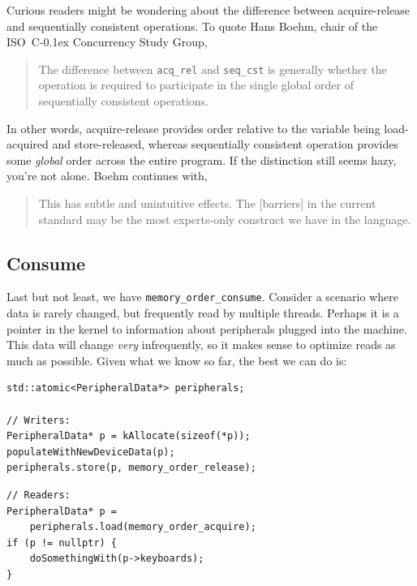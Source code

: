 \documentclass[fontsize=10pt, numbers=endperiod]{scrartcl}
\newcommand{\codesize}{\fontsize{10pt}{12pt}}
\newcommand{\cpp}[1]{C\kern-0.1ex\raisebox{0.15ex}{\texttt{++}}{\addfontfeature{Numbers=LowercaseOff}#1}}
\newenvironment{colfigure}
  {\par\vspace{1\baselineskip minus 0.5\baselineskip}\noindent\minipage{\linewidth}}
  {\endminipage\vspace*{1\baselineskip minus 0.7\baselineskip}}
\begin{document}
\begin{multicols*}{2}
Curious readers might be wondering about the difference between
acquire-release and sequentially consistent operations.
To quote Hans Boehm, chair of the ISO~\cpp{} Concurrency Study Group,
\begin{quote}
\small
The difference between \texttt{acq\_rel} and \texttt{seq\_cst} is generally
whether the operation is required to participate in the
single global order of sequentially consistent operations.
\end{quote}
In other words, acquire-release provides order relative to the variable
being load-acquired and store-released, whereas sequentially consistent
operation provides some \emph{global} order across the entire program.
If the distinction still seems hazy, you're not alone.
Boehm continues with,
\begin{quote}
\small
This has subtle and unintuitive effects.
The [barriers] in the current standard may be the most
experts-only construct we have in the language.
\end{quote}

\subsection{Consume}

Last but not least, we have \texttt{memory\_order\_consume}.
Consider a scenario where data is rarely changed,
but frequently read by multiple threads.
Perhaps it is a pointer in the kernel to information about peripherals
plugged into the machine.
This data will change \emph{very} infrequently,
so it makes sense to optimize reads as much as possible.
Given what we know so far, the best we can do is:
\begin{colfigure}
\begin{verbatim}
std::atomic<PeripheralData*> peripherals;

// Writers:
PeripheralData* p = kAllocate(sizeof(*p));
populateWithNewDeviceData(p);
peripherals.store(p, memory_order_release);
\end{verbatim}
\begin{verbatim}
// Readers:
PeripheralData* p =
    peripherals.load(memory_order_acquire);
if (p != nullptr) {
    doSomethingWith(p->keyboards);
}
\end{verbatim}
\end{colfigure}


\end{multicols*}
\end{document}
